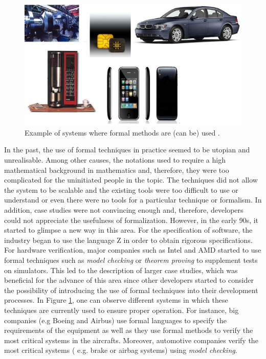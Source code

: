 \begin{figure}
\begin{center}
  \includegraphics[scale=0.5, width =\columnwidth]{Figures/usos}
\end{center}
  \caption{Example of systems where formal methods are (can be) used .}
  \label{fig:uso}
\end{figure}

In the past, the use of formal techniques in practice seemed to be utopian and unrealisable. 
Among other causes, the notations used to require a high mathematical background in
mathematics and, therefore, they were too complicated for the uninitiated people in the topic. 
The techniques did not allow the system to be scalable and the existing tools were
too difficult to use or understand or even there were no tools for a particular 
technique or formalism. In addition, case studies were not convincing enough and, 
therefore, developers could not appreciate the usefulness of formalization. 
However, in the early 90s, it started to glimpse a new way in this area. 
For the specification of software, the industry began to use the language Z 
in order to obtain rigorous specifications. For hardware verification, major 
companies such as Intel and AMD started to use formal techniques such as \emph{model checking} 
or \emph{theorem proving} to supplement tests on simulators. This led to the description of larger case studies,
which was beneficial for the advance of this area since other developers started to consider the possibility of 
introducing the use of formal techniques into their development processes.
In Figure \ref{fig:uso}, one can observe different systems in which these techniques are currently
used to ensure proper operation. For instance, big companies (e.g Boeing and Airbus)
use formal languages to specify the requirements of the equipment as well as they use 
formal methods to verify the most critical systems in the aircrafts. Moreover, automotive
companies verify the most critical systems ( e.g. brake or airbag systems) using \emph{model checking}. 

